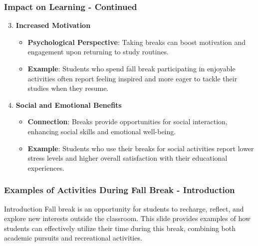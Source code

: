 \documentclass[aspectratio=169]{beamer}
\begin{document}
\begin{frame}[fragile]
    \frametitle{Impact on Learning - Continued}
    \begin{enumerate}
        \setcounter{enumi}{2}
        \item \textbf{Increased Motivation}
        \begin{itemize}
            \item \textbf{Psychological Perspective}: Taking breaks can boost motivation and engagement upon returning to study routines.
            \item \textbf{Example}: Students who spend fall break participating in enjoyable activities often report feeling inspired and more eager to tackle their studies when they resume.
        \end{itemize}

        \item \textbf{Social and Emotional Benefits}
        \begin{itemize}
            \item \textbf{Connection}: Breaks provide opportunities for social interaction, enhancing social skills and emotional well-being.
            \item \textbf{Example}: Students who use their breaks for social activities report lower stress levels and higher overall satisfaction with their educational experiences.
        \end{itemize}
    \end{enumerate}
\end{frame}

\begin{frame}[fragile]
    \frametitle{Examples of Activities During Fall Break - Introduction}
    \begin{block}{Introduction}
        Fall break is an opportunity for students to recharge, reflect, and explore new interests outside the classroom. This slide provides examples of how students can effectively utilize their time during this break, combining both academic pursuits and recreational activities.
    \end{block}
\end{frame}
\end{document}
